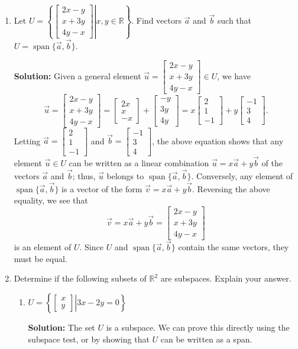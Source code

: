 \documentclass[12pt]{article}
\newcommand{\R}{\mathbb{R}}
\newcommand{\bbm}{\begin{bmatrix}}
\newcommand{\ebm}{\end{bmatrix}}
\begin{document}
\begin{enumerate}
\bigskip

\item Let $U = \left\{\left.\bbm 2x-y\\x+3y\\4y-x\ebm \right|x,y\in\R\right\}$. Find vectors $\vec{a}$ and $\vec{b}$ such that $U=\operatorname{span}\{\vec{a},\vec{b}\}$.

\bigskip

{\bf Solution:} Given a general element $\vec{u}=\bbm 2x-y\\x+3y\\4y-x\ebm\in U$, we have
\[
 \vec{u}=\bbm 2x-y\\x+3y\\4y-x\ebm=\bbm 2x\\x\\-x\ebm+\bbm-y\\3y\\4y\ebm = x\bbm 2\\1\\-1\ebm+y\bbm -1\\3\\4\ebm.
\]
Letting $\vec{a} = \bbm 2\\1\\-1\ebm$ and $\vec{b} = \bbm -1\\3\\4\ebm$, the above equation shows that any element $\vec{u}\in U$ can be written as a linear combination $\vec{u}=x\vec{a}+y\vec{b}$ of the vectors $\vec{a}$ and $\vec{b}$; thus, $\vec{u}$ belongs to $\operatorname{span}\{\vec{a},\vec{b}\}$. Conversely, any element of $\operatorname{span}\{\vec{a},\vec{b}\}$ is a vector of the form $\vec{v}=x\vec{a}+y\vec{b}$. Reversing the above equality, we see that 
\[
 \vec{v}=x\vec{a}+y\vec{b} = \bbm 2x-y\\x+3y\\4y-x\ebm
\]
is an element of $U$. Since $U$ and $\operatorname{span}\{\vec{a},\vec{b}\}$ contain the same vectors, they must be equal.

\bigskip


\item Determine if the following subsets of $\R^2$ are subspaces. Explain your answer.
\begin{enumerate}
 \item $U=\left\{\left.\bbm x\\y\ebm \right| 3x-2y=0\right\}$

\bigskip

{\bf Solution:} The set $U$ is a subspace. We can prove this directly using the subspace test, or by showing that $U$ can be written as a span.


\end{enumerate}
\end{enumerate}
\end{document}
